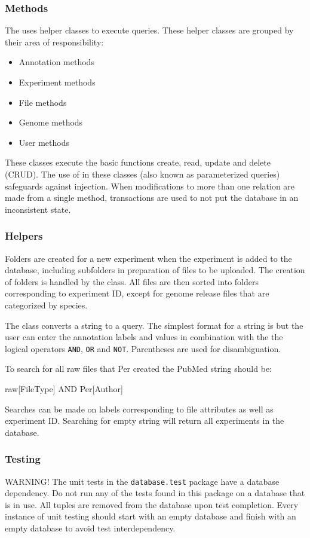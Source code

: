 \subsubsection{Methods}
The  uses helper classes to execute  queries. These helper classes are grouped by their area of responsibility:
\begin{itemize}
\item Annotation methods
\item Experiment methods
\item File methods
\item Genome methods
\item User methods
\end{itemize}
These classes execute the basic  functions create, read, update and delete (CRUD). The use of  in these classes (also known as parameterized queries) safeguards against  injection. When modifications to more than one relation are made from a single method, transactions are used to not put the database in an inconsistent state.

\subsubsection{Helpers}
Folders are created for a new experiment when the experiment is added to the database, including subfolders in preparation of files to be uploaded. The creation of folders is handled by the  class. All files are then sorted into folders corresponding to experiment ID, except for genome release files that are categorized by species.

The  class converts a  string to a  query. The simplest format for a  string is  but the user can enter the annotation labels and values in combination with the the logical operators \texttt{AND}, \texttt{OR} and \texttt{NOT}. Parentheses are used for disambiguation.
\begin{example}
To search for all raw files that Per created the PubMed string should be:

raw[FileType] AND Per[Author]
\end{example}

Searches can be made on labels corresponding to file attributes as well as experiment ID. Searching for empty string will return all experiments in the database.

\subsubsection{Testing}
WARNING! The unit tests in the \texttt{database.test} package have a database dependency. Do not run any of the tests found in this package on a database that is in use. All tuples are removed from the database upon test completion. Every instance of unit testing should start with an empty database and finish with an empty database to avoid test interdependency.

